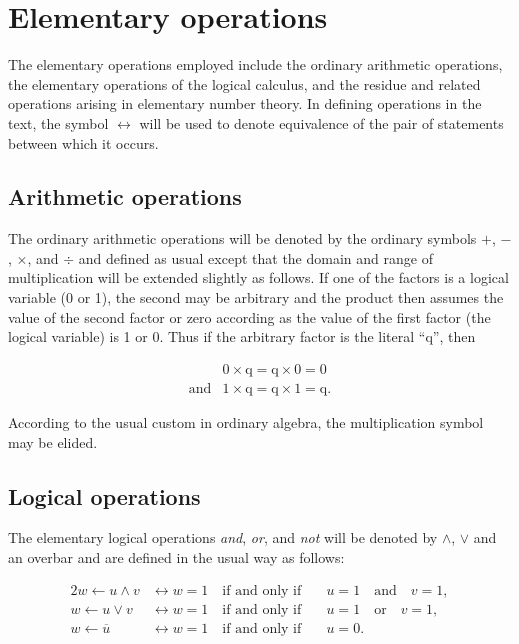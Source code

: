 \section{Elementary operations}

\par The elementary operations employed include the ordinary arithmetic operations, the elementary operations of the logical calculus, and the residue and related operations arising in elementary number theory. In defining operations in the text, the symbol $\leftrightarrow$ will be used to denote equivalence of the pair of statements between which it occurs.

\subsection*{Arithmetic operations}

The ordinary arithmetic operations will be denoted by the ordinary symbols $+$, $-$, $\times$, and $÷$ and defined as usual except that the domain and range of multiplication will be extended slightly as follows. If one of the factors is a logical variable (0 or 1), the second may be arbitrary and the product then assumes the value of the second factor or zero according as the value of the first factor (the logical variable) is 1 or 0. Thus if the arbitrary factor is the literal ``q'', then

\begin{align*}
           & 0 \times \text{q} = \text{q} \times 0 = 0 \\
\text{and} & 1 \times \text{q} = \text{q} \times 1 = \text{q}.
\end{align*}

\par According to the usual custom in ordinary algebra, the multiplication symbol may be elided.

\subsection*{Logical operations}

\par The elementary logical operations \textit{and}, \textit{or}, and \textit{not} will be denoted by $\wedge$, $\vee$ and an overbar and are defined in the usual way as follows:

\begin{alignat*}{2}
 w ← u \wedge v  & \leftrightarrow w = 1 \quad\text{if and only if}\quad & u = 1 \quad\text{and}\quad v = 1, \\
 w ← u \vee v    & \leftrightarrow w = 1 \quad\text{if and only if}\quad & u = 1 \quad\text{or} \quad v = 1, \\
 w ← \overbar{u} & \leftrightarrow w = 1 \quad\text{if and only if}\quad & u = 0.
\end{alignat*}

